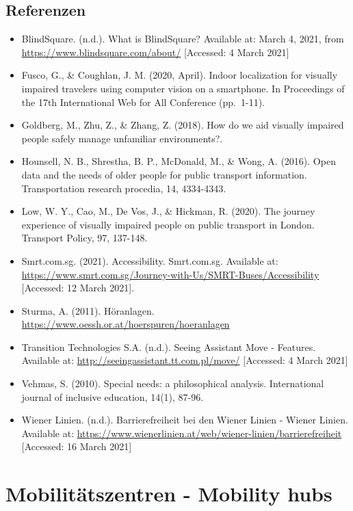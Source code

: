 \documentclass[
]{book}
\providecommand{\tightlist}{%
  \setlength{\itemsep}{0pt}\setlength{\parskip}{0pt}}
\begin{document}
\hypertarget{referenzen-27}{%
\subsection*{Referenzen}\label{referenzen-27}}

\begin{itemize}
\tightlist
\item
  BlindSquare. (n.d.). What is BlindSquare? Available at: March 4, 2021, from \url{https://www.blindsquare.com/about/} {[}Accessed: 4 March 2021{]}
\item
  Fusco, G., \& Coughlan, J. M. (2020, April). Indoor localization for visually impaired travelers using computer vision on a smartphone. In Proceedings of the 17th International Web for All Conference (pp.~1-11).
\item
  Goldberg, M., Zhu, Z., \& Zhang, Z. (2018). How do we aid visually impaired people safely manage unfamiliar environments?.
\item
  Hounsell, N. B., Shrestha, B. P., McDonald, M., \& Wong, A. (2016). Open data and the needs of older people for public transport information. Transportation research procedia, 14, 4334-4343.
\item
  Low, W. Y., Cao, M., De Vos, J., \& Hickman, R. (2020). The journey experience of visually impaired people on public transport in London. Transport Policy, 97, 137-148.
\item
  Smrt.com.sg. (2021). Accessibility. Smrt.com.sg. Available at: \url{https://www.smrt.com.sg/Journey-with-Us/SMRT-Buses/Accessibility} {[}Accessed: 12 March 2021{]}.
\item
  Sturma, A. (2011). Höranlagen. \url{https://www.oessh.or.at/hoerspuren/hoeranlagen}
\item
  Transition Technologies S.A. (n.d.). Seeing Assistant Move - Features. Available at: \url{http://seeingassistant.tt.com.pl/move/} {[}Accessed: 4 March 2021{]}
\item
  Vehmas, S. (2010). Special needs: a philosophical analysis. International journal of inclusive education, 14(1), 87-96.
\item
  Wiener Linien. (n.d.). Barrierefreiheit bei den Wiener Linien - Wiener Linien. Available at: \url{https://www.wienerlinien.at/web/wiener-linien/barrierefreiheit} {[}Accessed: 16 March 2021{]}
\end{itemize}

\hypertarget{mobility_hubs}{%
\section{Mobilitätszentren - Mobility hubs}\label{mobility_hubs}}
\end{document}
